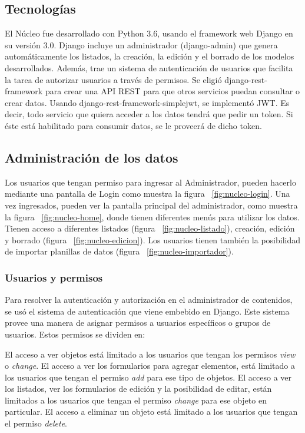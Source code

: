 \subsection{Tecnologías}

El Núcleo fue desarrollado con Python 3.6, usando el framework web Django en su versión 3.0.
Django incluye un administrador (django-admin) que genera automáticamente los listados, la creación, la edición y el borrado de los modelos desarrollados. Además, trae un sistema de autenticación de usuarios que facilita la tarea de autorizar usuarios a través de permisos.
Se eligió django-rest-framework para crear una API REST para que otros servicios puedan consultar o crear datos.
Usando django-rest-framework-simplejwt, se implementó JWT. Es decir, todo servicio que quiera acceder a los datos tendrá que pedir un token. Si éste está habilitado para consumir datos, se le proveerá de dicho token.

\subsection{Administración de los datos}

Los usuarios que tengan permiso para ingresar al Administrador, pueden hacerlo mediante una pantalla de Login como muestra la figura ~\ref{fig:nucleo-login}.
Una vez ingresados, pueden ver la pantalla principal del administrador, como muestra la figura ~\ref{fig:nucleo-home}, donde tienen diferentes menús para utilizar los datos. Tienen acceso a diferentes listados (figura ~\ref{fig:nucleo-listado}), creación, edición y borrado (figura ~\ref{fig:nucleo-edicion}).
Los usuarios tienen también la posibilidad de importar planillas de datos (figura ~\ref{fig:nucleo-importador}).

\subsubsection{Usuarios y permisos}

Para resolver la autenticación y autorización en el administrador de contenidos, se usó el sistema de autenticación que viene embebido en Django.
Este sistema provee una manera de asignar permisos a usuarios específicos o grupos de usuarios. Estos permisos se dividen en:
\begin{outline}
    \1 El acceso a ver objetos está limitado a los usuarios que tengan los permisos \textit{view} o \textit{change}.
    \1 El acceso a ver los formularios para agregar elementos, está limitado a los usuarios que tengan el permiso \textit{add} para ese tipo de objetos.
    \1 El acceso a ver los listados, ver los formularios de edición y la posibilidad de editar, están limitados a los usuarios que tengan el permiso \textit{change} para ese objeto en particular.
    \1 El acceso a eliminar un objeto está limitado a los usuarios que tengan el permiso \textit{delete}.
\end{outline}

